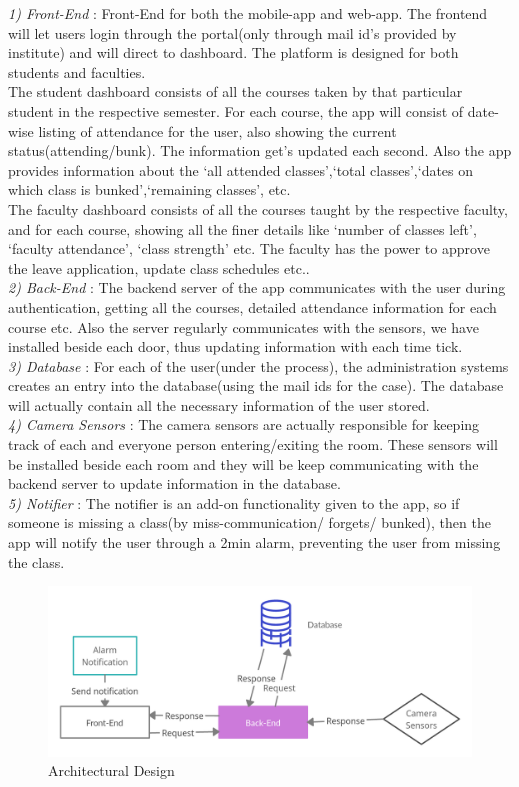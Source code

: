 \documentclass[conference]{IEEEtran}
\begin{document}
\emph {1) Front-End} : Front-End for both the mobile-app and web-app. The frontend will let users login through the portal(only through mail id's provided by institute) and will direct to dashboard. The platform is designed for both students and faculties.\\
The student dashboard consists of all the courses taken by that particular student in the respective semester. For each course, the app will consist of date-wise listing of attendance for the user, also showing the current status(attending/bunk). The information get's updated each second. Also the app provides information about the `all attended classes',`total classes',`dates on which class is bunked',`remaining classes', etc. \\
The faculty dashboard consists of all the courses taught by the respective faculty, and for each course, showing all the finer details like `number of classes left', `faculty attendance', `class strength' etc. The faculty has the power to approve the leave application, update class schedules etc..\\

\emph {2) Back-End} : The backend server of the app communicates with the user during authentication, getting all the courses, detailed attendance information for each course etc. Also the server regularly communicates with the sensors, we have installed beside each door, thus updating information with each time tick.\\

\emph {3) Database} : For each of the user(under the process), the administration systems creates an entry into the database(using the mail ids for the case). The database will actually contain all the necessary information of the user stored.\\

\emph {4) Camera Sensors} : The camera sensors are actually responsible for keeping track of each and everyone person entering/exiting the room. These sensors will be installed beside each room and they will be keep communicating with the backend server to update information in the database.\\

\emph {5) Notifier} : The notifier is an add-on functionality given to the app, so if someone is missing a class(by miss-communication/ forgets/ bunked), then the app will notify the user through a 2min alarm, preventing the user from missing the class.\\

\begin{figure}[htbp]
\centerline{\includegraphics[scale=0.2]{Architecture.png}}
\caption{Architectural Design}
\label{fig}
\end{figure}
\end{document}
